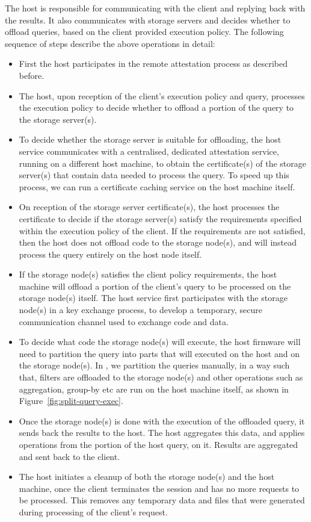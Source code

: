 The host is responsible for communicating with the client and replying back with the results. It also communicates with storage servers and decides whether to offload queries, based on the client provided execution policy. The following sequence of steps describe the above operations in detail:
\begin{itemize}
    \item First the host participates in the remote attestation process as described before.
    \item The host, upon reception of the client's execution policy and query, processes the execution policy to decide whether to offload a portion of the query to the storage server(s).
    \item To decide whether the storage server is suitable for offloading, the host service communicates with a centralised, dedicated attestation service, running on a different host machine, to obtain the certificate(s) of the storage server(s) that contain data needed to process the query. To speed up this process, we can run a certificate caching service on the host machine itself.
    \item On reception of the storage server certificate(s), the host processes the certificate to decide if the storage server(s) satisfy the requirements specified within the execution policy of the client. If the requirements are not satisfied, then the host does not offload code to the storage node(s), and will instead process the query entirely on the host node itself.
    \item If the storage node(s) satisfies the client policy requirements, the host machine will offload a portion of the client's query to be processed on the storage node(s) itself. The host service first participates with the storage node(s) in a key exchange process, to develop a temporary, secure communication channel used to exchange code and data. 
    \item To decide what code the storage node(s) will execute, the host firmware will need to partition the query into parts that will executed on the host and on the storage node(s). In \project{}, we partition the queries manually, in a way such that, filters are offloaded to the storage node(s) and other operations such as aggregation, group-by etc are run on the host machine itself, as shown in Figure~\ref{fig:split-query-exec}.
    \item Once the storage node(s) is done with the execution of the offloaded query, it sends back the results to the host. The host aggregates this data, and applies operations from the portion of the host query, on it. Results are aggregated and sent back to the client.
    \item The host initiates a cleanup of both the storage node(s) and the host machine, once the client terminates the session and has no more requests to be processed. This removes any temporary data and files that were generated during processing of the client's request.
\end{itemize}

